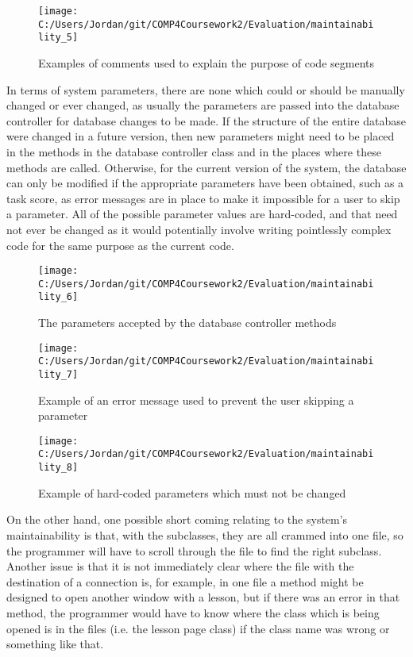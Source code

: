 \begin{figure}[H]
	\texttt{[image: C:/Users/Jordan/git/COMP4Coursework2/Evaluation/maintainability\_5]}
	\caption{Examples of comments used to explain the purpose of code segments}
\end{figure}

In terms of system parameters, there are none which could or should be manually changed or ever changed, as usually the parameters are passed into the database controller for database changes to be made. If the structure of the entire database were changed in a future version, then new parameters might need to be placed in the methods in the database controller class and in the places where these methods are called. Otherwise, for the current version of the system, the database can only be modified if the appropriate parameters have been obtained, such as a task score, as error messages are in place to make it impossible for a user to skip a parameter. All of the possible parameter values are hard-coded, and that need not ever be changed as it would potentially involve writing pointlessly complex code for the same purpose as the current code.

\begin{figure}[H]
	\texttt{[image: C:/Users/Jordan/git/COMP4Coursework2/Evaluation/maintainability\_6]}
	\caption{The parameters accepted by the database controller methods}
\end{figure}

\begin{figure}[H]
	\texttt{[image: C:/Users/Jordan/git/COMP4Coursework2/Evaluation/maintainability\_7]}
	\caption{Example of an error message used to prevent the user skipping a parameter}
\end{figure}

\begin{figure}[H]
	\texttt{[image: C:/Users/Jordan/git/COMP4Coursework2/Evaluation/maintainability\_8]}
	\caption{Example of hard-coded parameters which must not be changed}
\end{figure}

On the other hand, one possible short coming relating to the system's maintainability is that, with the subclasses, they are all crammed into one file, so the programmer will have to scroll through the file to find the right subclass. Another issue is that it is not immediately clear where the file with the destination of a connection is, for example, in one file a method might be designed to open another window with a lesson, but if there was an error in that method, the programmer would have to know where the class which is being opened is in the files (i.e. the lesson page class) if the class name was wrong or something like that. 

